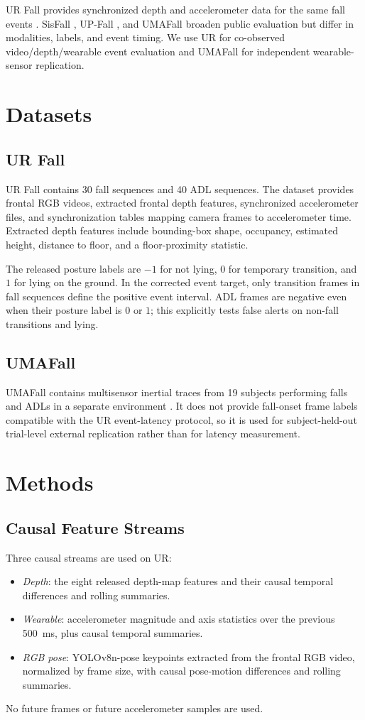 \documentclass[journal]{IEEEtran}
\begin{document}
UR Fall provides synchronized depth and accelerometer data for the same fall events \cite{Kwolek2014UR,Kepski2018Event}. SisFall \cite{Sucerquia2017SisFall}, UP-Fall \cite{MartinezVillasenor2019UPFall}, and UMAFall \cite{Casilari2017UMAFall} broaden public evaluation but differ in modalities, labels, and event timing. We use UR for co-observed video/depth/wearable event evaluation and UMAFall for independent wearable-sensor replication.

\section{Datasets}
\subsection{UR Fall}
UR Fall contains 30 fall sequences and 40 ADL sequences. The dataset provides frontal RGB videos, extracted frontal depth features, synchronized accelerometer files, and synchronization tables mapping camera frames to accelerometer time. Extracted depth features include bounding-box shape, occupancy, estimated height, distance to floor, and a floor-proximity statistic.

The released posture labels are $-1$ for not lying, $0$ for temporary transition, and $1$ for lying on the ground. In the corrected event target, only transition frames in fall sequences define the positive event interval. ADL frames are negative even when their posture label is $0$ or $1$; this explicitly tests false alerts on non-fall transitions and lying.

\subsection{UMAFall}
UMAFall contains multisensor inertial traces from 19 subjects performing falls and ADLs in a separate environment \cite{Casilari2017UMAFall}. It does not provide fall-onset frame labels compatible with the UR event-latency protocol, so it is used for subject-held-out trial-level external replication rather than for latency measurement.

\section{Methods}
\subsection{Causal Feature Streams}
Three causal streams are used on UR:
\begin{itemize}
  \item \textit{Depth}: the eight released depth-map features and their causal temporal differences and rolling summaries.
  \item \textit{Wearable}: accelerometer magnitude and axis statistics over the previous \SI{500}{ms}, plus causal temporal summaries.
  \item \textit{RGB pose}: YOLOv8n-pose keypoints extracted from the frontal RGB video, normalized by frame size, with causal pose-motion differences and rolling summaries.
\end{itemize}
No future frames or future accelerometer samples are used.
\end{document}
